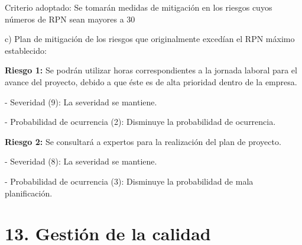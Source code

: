 \documentclass[11pt]{charter}
\begin{document}
Criterio adoptado: 
Se tomarán medidas de mitigación en los riesgos cuyos números de RPN sean mayores a 30

c) Plan de mitigación de los riesgos que originalmente excedían el RPN máximo establecido:
 
\textbf{Riesgo 1: }Se podrán utilizar horas correspondientes a la jornada laboral para el avance del proyecto, debido a que éste es de alta prioridad dentro de la empresa.

  - Severidad (9): La severidad se mantiene.

  - Probabilidad de ocurrencia (2): Disminuye la probabilidad de ocurrencia.

\textbf{Riesgo 2:} Se consultará a expertos para la realización del plan de proyecto.

  - Severidad (8): La severidad se mantiene.

  - Probabilidad de ocurrencia (3): Disminuye la probabilidad de mala planificación.


\section{13. Gestión de la calidad}
\label{sec:calidad}
\end{document}
